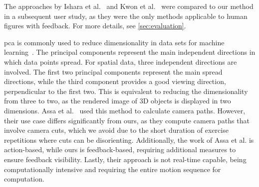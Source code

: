 The approaches by Ishara et al.~\cite{ishara2015mra} and Kwon et al.~\cite{kwon2020ocp} were compared to our method in a subsequent user study, as they were the only methods applicable to human figures with feedback. For more details, see \autoref{sec:evaluation}.

\acrshort{pca} is commonly used to reduce dimensionality in data sets for machine learning~\cite{sorzano2014sdr}. The principal components represent the main independent directions in which data points spread. For spatial data, three independent directions are involved. The first two principal components represent the main spread directions, while the third component provides a good viewing direction, perpendicular to the first two. This is equivalent to reducing the dimensionality from three to two, as the rendered image of 3D objects is displayed in two dimensions. Assa et al.~\cite{assa2008moh} used this method to calculate camera paths. However, their use case differs significantly from ours, as they compute camera paths that involve camera cuts, which we avoid due to the short duration of exercise repetitions where cuts can be disorienting. Additionally, the work of Assa et al. is action-based, while ours is feedback-based, requiring additional measures to ensure feedback visibility. Lastly, their approach is not real-time capable, being computationally intensive and requiring the entire motion sequence for computation.

